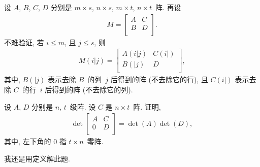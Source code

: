 \documentclass[../libro.tex]{subfiles}
\begin{document}
设 \(A\), \(B\), \(C\), \(D\)
分别是 \(m \times s\), \(n \times s\),
\(m \times t\), \(n \times t\)~阵.
再设
\begin{align*}
    M =
    \begin{bmatrix}
        A & C \\
        B & D \\
    \end{bmatrix}.
\end{align*}
不难验证, 若 \(i \leq m\), 且 \(j \leq s\),
则
\begin{align*}
    M(i|j)
    =
    \begin{bmatrix}
        A(i|j) & C(i|) \\
        B(|j)  & D     \\
    \end{bmatrix},
\end{align*}
其中, \(B(|j)\) 表示去除 \(B\)~的列~\(j\) 后得到的阵
(不去除它的行),
且 \(C(i|)\) 表示去除 \(C\)~的行~\(i\) 后得到的阵
(不去除它的列).

\begin{example}
    设 \(A\), \(D\) 分别是 \(n\), \(t\)~级阵.
    设 \(C\) 是 \(n \times t\)~阵.
    证明,
    \begin{align*}
        \det {
            \begin{bmatrix}
                A & C \\
                0 & D \\
            \end{bmatrix}
        }
        = \det {(A)} \det {(D)},
    \end{align*}
    其中, 左下角的 \(0\) 指 \(t \times n\)~零阵.
\end{example}


我还是用定义解此题.
\end{document}
